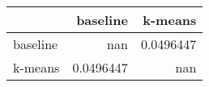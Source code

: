\begin{tabular}{lrr}
\toprule
          &    baseline &     k-means \\
\midrule
 baseline & nan         &   0.0496447 \\
 k-means  &   0.0496447 & nan         \\
\bottomrule
\end{tabular}
